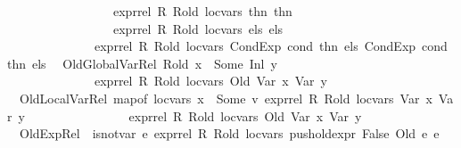 \begin{isabellebody}
\ \ \ \ \ \ \ \ \ \ \ \ \ \ \ \ \ expr{\isacharunderscore}{\kern0pt}rel\ R\ R{\isacharunderscore}{\kern0pt}old\ loc{\isacharunderscore}{\kern0pt}vars\ thn{}\ thn{}{\isacharsemicolon}{\kern0pt}\isanewline
\ \ \ \ \ \ \ \ \ \ \ \ \ \ \ \ \ expr{\isacharunderscore}{\kern0pt}rel\ R\ R{\isacharunderscore}{\kern0pt}old\ loc{\isacharunderscore}{\kern0pt}vars\ els{}\ els{}\ {\isasymrbrakk}\ {\isasymLongrightarrow}\isanewline
\ \ \ \ \ \ \ \ \ \ \ \ \ \ expr{\isacharunderscore}{\kern0pt}rel\ R\ R{\isacharunderscore}{\kern0pt}old\ loc{\isacharunderscore}{\kern0pt}vars\ {\isacharparenleft}{\kern0pt}CondExp\ cond{}\ thn{}\ els{}{\isacharparenright}{\kern0pt}\ {\isacharparenleft}{\kern0pt}CondExp\ cond{}\ thn{}\ els{}{\isacharparenright}{\kern0pt}{\isachardoublequoteclose}\isanewline
\ {\isacharbar}{\kern0pt}\ OldGlobalVar{\isacharunderscore}{\kern0pt}Rel{\isacharcolon}{\kern0pt}\ {\isachardoublequoteopen}{\isasymlbrakk}R{\isacharunderscore}{\kern0pt}old\ x\ {\isacharequal}{\kern0pt}\ Some\ {\isacharparenleft}{\kern0pt}Inl\ y{\isacharparenright}{\kern0pt}{\isasymrbrakk}\ {\isasymLongrightarrow}\isanewline
\ \ \ \ \ \ \ \ \ \ \ \ \ \ expr{\isacharunderscore}{\kern0pt}rel\ R\ R{\isacharunderscore}{\kern0pt}old\ loc{\isacharunderscore}{\kern0pt}vars\ {\isacharparenleft}{\kern0pt}Old\ {\isacharparenleft}{\kern0pt}Var\ x{\isacharparenright}{\kern0pt}{\isacharparenright}{\kern0pt}\ {\isacharparenleft}{\kern0pt}Var\ y{\isacharparenright}{\kern0pt}{\isachardoublequoteclose}\isanewline
\ {\isacharbar}{\kern0pt}\ OldLocalVar{\isacharunderscore}{\kern0pt}Rel{\isacharcolon}{\kern0pt}\ {\isachardoublequoteopen}{\isasymlbrakk}map{\isacharunderscore}{\kern0pt}of\ loc{\isacharunderscore}{\kern0pt}vars\ x\ {\isacharequal}{\kern0pt}\ Some\ v{\isacharsemicolon}{\kern0pt}\ expr{\isacharunderscore}{\kern0pt}rel\ R\ R{\isacharunderscore}{\kern0pt}old\ loc{\isacharunderscore}{\kern0pt}vars\ {\isacharparenleft}{\kern0pt}Var\ x{\isacharparenright}{\kern0pt}\ {\isacharparenleft}{\kern0pt}Var\ y{\isacharparenright}{\kern0pt}{\isasymrbrakk}\ {\isasymLongrightarrow}\ \isanewline
\ \ \ \ \ \ \ \ \ \ \ \ \ \ expr{\isacharunderscore}{\kern0pt}rel\ R\ R{\isacharunderscore}{\kern0pt}old\ loc{\isacharunderscore}{\kern0pt}vars\ {\isacharparenleft}{\kern0pt}Old\ {\isacharparenleft}{\kern0pt}Var\ x{\isacharparenright}{\kern0pt}{\isacharparenright}{\kern0pt}\ {\isacharparenleft}{\kern0pt}Var\ y{\isacharparenright}{\kern0pt}{\isachardoublequoteclose}\isanewline
\ {\isacharbar}{\kern0pt}\ OldExp{\isacharunderscore}{\kern0pt}Rel{\isacharcolon}{\kern0pt}\ {\isachardoublequoteopen}{\isasymlbrakk}\ is{\isacharunderscore}{\kern0pt}not{\isacharunderscore}{\kern0pt}var\ e{}{\isacharsemicolon}{\kern0pt}\ expr{\isacharunderscore}{\kern0pt}rel\ R\ R{\isacharunderscore}{\kern0pt}old\ loc{\isacharunderscore}{\kern0pt}vars\ {\isacharparenleft}{\kern0pt}push{\isacharunderscore}{\kern0pt}old{\isacharunderscore}{\kern0pt}expr\ False\ {\isacharparenleft}{\kern0pt}Old\ e{}{\isacharparenright}{\kern0pt}{\isacharparenright}{\kern0pt}\ e{}\ {\isasymrbrakk}\ \ {\isasymLongrightarrow}\ \isanewline

\end{isabellebody}
